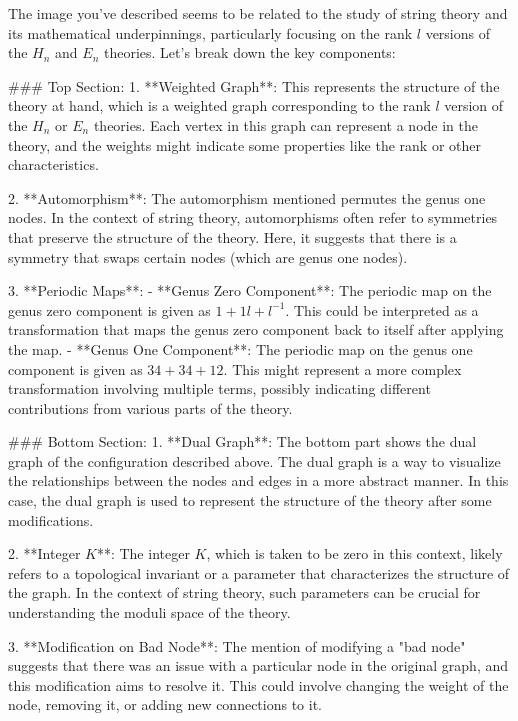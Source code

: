 The image you've described seems to be related to the study of string theory and its mathematical underpinnings, particularly focusing on the rank \( l \) versions of the \( H_n \) and \( E_n \) theories. Let's break down the key components:

### Top Section:
1. **Weighted Graph**: This represents the structure of the theory at hand, which is a weighted graph corresponding to the rank \( l \) version of the \( H_n \) or \( E_n \) theories. Each vertex in this graph can represent a node in the theory, and the weights might indicate some properties like the rank or other characteristics.

2. **Automorphism**: The automorphism mentioned permutes the genus one nodes. In the context of string theory, automorphisms often refer to symmetries that preserve the structure of the theory. Here, it suggests that there is a symmetry that swaps certain nodes (which are genus one nodes).

3. **Periodic Maps**:
   - **Genus Zero Component**: The periodic map on the genus zero component is given as \( 1 + 1l + l^{-1} \). This could be interpreted as a transformation that maps the genus zero component back to itself after applying the map.
   - **Genus One Component**: The periodic map on the genus one component is given as \( 34 + 34 + 12 \). This might represent a more complex transformation involving multiple terms, possibly indicating different contributions from various parts of the theory.

### Bottom Section:
1. **Dual Graph**: The bottom part shows the dual graph of the configuration described above. The dual graph is a way to visualize the relationships between the nodes and edges in a more abstract manner. In this case, the dual graph is used to represent the structure of the theory after some modifications.

2. **Integer \( K \)**: The integer \( K \), which is taken to be zero in this context, likely refers to a topological invariant or a parameter that characterizes the structure of the graph. In the context of string theory, such parameters can be crucial for understanding the moduli space of the theory.

3. **Modification on Bad Node**: The mention of modifying a "bad node" suggests that there was an issue with a particular node in the original graph, and this modification aims to resolve it. This could involve changing the weight of the node, removing it, or adding new connections to it.

